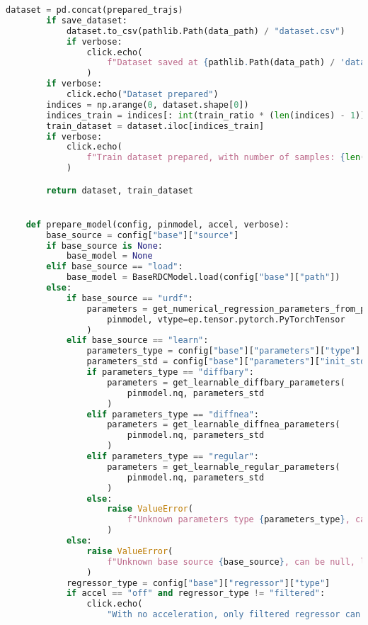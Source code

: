 \begin{lstlisting}[language=python, caption=\raggedright{identification/full.py}, frame=single]
        dataset = pd.concat(prepared_trajs)
        if save_dataset:
            dataset.to_csv(pathlib.Path(data_path) / "dataset.csv")
            if verbose:
                click.echo(
                    f"Dataset saved at {pathlib.Path(data_path) / 'dataset.csv'}"
                )
        if verbose:
            click.echo("Dataset prepared")
        indices = np.arange(0, dataset.shape[0])
        indices_train = indices[: int(train_ratio * (len(indices) - 1))]
        train_dataset = dataset.iloc[indices_train]
        if verbose:
            click.echo(
                f"Train dataset prepared, with number of samples: {len(train_dataset)}",
            )

        return dataset, train_dataset


    def prepare_model(config, pinmodel, accel, verbose):
        base_source = config["base"]["source"]
        if base_source is None:
            base_model = None
        elif base_source == "load":
            base_model = BaseRDCModel.load(config["base"]["path"])
        else:
            if base_source == "urdf":
                parameters = get_numerical_regression_parameters_from_pinocchio(
                    pinmodel, vtype=ep.tensor.pytorch.PyTorchTensor
                )
            elif base_source == "learn":
                parameters_type = config["base"]["parameters"]["type"]
                parameters_std = config["base"]["parameters"]["init_std"]
                if parameters_type == "diffbary":
                    parameters = get_learnable_diffbary_parameters(
                        pinmodel.nq, parameters_std
                    )
                elif parameters_type == "diffnea":
                    parameters = get_learnable_diffnea_parameters(
                        pinmodel.nq, parameters_std
                    )
                elif parameters_type == "regular":
                    parameters = get_learnable_regular_parameters(
                        pinmodel.nq, parameters_std
                    )
                else:
                    raise ValueError(
                        f"Unknown parameters type {parameters_type}, can be diffbary, diffnea or regular"
                    )
            else:
                raise ValueError(
                    f"Unknown base source {base_source}, can be null, load, urdf or learn"
                )
            regressor_type = config["base"]["regressor"]["type"]
            if accel == "off" and regressor_type != "filtered":
                click.echo(
                    "With no acceleration, only filtered regressor can be used, defaulting to filtered"

\end{lstlisting}
